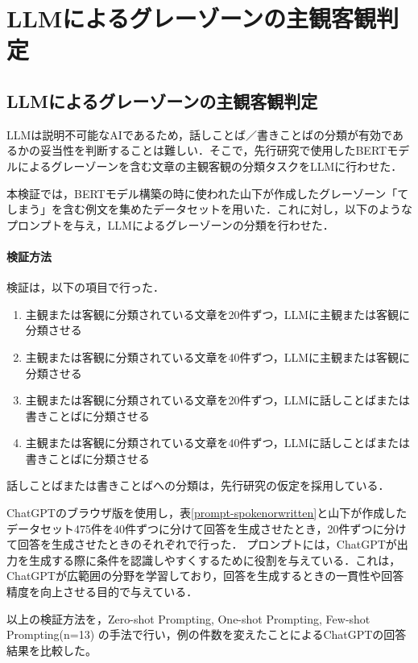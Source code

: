 \chapter{LLMによるグレーゾーンの主観客観判定 \label{c5}}

\section{LLMによるグレーゾーンの主観客観判定 \label{c5s2}}
LLMは説明不可能なAIであるため，話しことば／書きことばの分類が有効であるかの妥当性を判断することは難しい．そこで，先行研究で使用したBERTモデルによるグレーゾーンを含む文章の主観客観の分類タスクをLLMに行わせた．

本検証では，BERTモデル構築の時に使われた山下が作成したグレーゾーン「てしまう」を含む例文を集めたデータセットを用いた．これに対し，以下のようなプロンプトを与え，LLMによるグレーゾーンの分類を行わせた．



\subsubsection{検証方法}
検証は，以下の項目で行った．
\begin{enumerate}
    \item 主観または客観に分類されている文章を20件ずつ，LLMに主観または客観に分類させる
    \item 主観または客観に分類されている文章を40件ずつ，LLMに主観または客観に分類させる
    \item 主観または客観に分類されている文章を20件ずつ，LLMに話しことばまたは書きことばに分類させる
    \item 主観または客観に分類されている文章を40件ずつ，LLMに話しことばまたは書きことばに分類させる
\end{enumerate}
話しことばまたは書きことばへの分類は，先行研究\cite{checker}の仮定を採用している．

ChatGPTのブラウザ版を使用し，表\ref{prompt-spokenorwritten}と山下が作成したデータセット475件を40件ずつに分けて回答を生成させたとき，20件ずつに分けて回答を生成させたときのそれぞれで行った．
プロンプトには，ChatGPTが出力を生成する際に条件を認識しやすくするために役割を与えている．これは，ChatGPTが広範囲の分野を学習しており，回答を生成するときの一貫性や回答精度を向上させる目的で与えている．




以上の検証方法を，Zero-shot Prompting, One-shot Prompting, Few-shot Prompting(n=13) の手法で行い，例の件数を変えたことによるChatGPTの回答結果を比較した。

